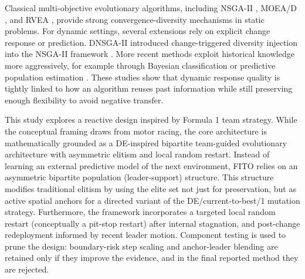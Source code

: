 \documentclass[preprint,12pt]{elsarticle}
\begin{document}
Classical multi-objective evolutionary algorithms, including NSGA-II \cite{Deb2002NSGAII}, MOEA/D \cite{Zhang2007MOEAD}, and RVEA \cite{Cheng2016RVEA}, provide strong convergence-diversity mechanisms in static problems. For dynamic settings, several extensions rely on explicit change response or prediction. DNSGA-II introduced change-triggered diversity injection into the NSGA-II framework \cite{Deb2007DNSGAII}. More recent methods exploit historical knowledge more aggressively, for example through Bayesian classification \cite{Ye2022KGB} or predictive population estimation \cite{Gao2024MDDM}. These studies show that dynamic response quality is tightly linked to how an algorithm reuses past information while still preserving enough flexibility to avoid negative transfer.

This study explores a reactive design inspired by Formula 1 team strategy. While the conceptual framing draws from motor racing, the core architecture is mathematically grounded as a DE-inspired bipartite team-guided evolutionary architecture with asymmetric elitism and local random restart. Instead of learning an external predictive model of the next environment, FITO relies on an asymmetric bipartite population (leader-support) structure. This structure modifies traditional elitism by using the elite set not just for preservation, but as active spatial anchors for a directed variant of the DE/current-to-best/1 mutation strategy. Furthermore, the framework incorporates a targeted local random restart (conceptually a pit-stop restart) after internal stagnation, and post-change redeployment informed by recent leader motion. Component testing is used to prune the design: boundary-risk step scaling and anchor-leader blending are retained only if they improve the evidence, and in the final reported method they are rejected.
\end{document}

